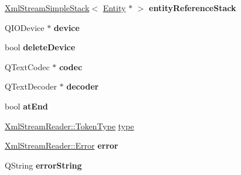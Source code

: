 \begin{DoxyCompactItemize}
\item 
\mbox{\label{class_xml_stream_reader_private_a58b68714e930a9ff4055073348e4fae2}} 
\hyperlink{class_xml_stream_simple_stack}{Xml\+Stream\+Simple\+Stack}$<$ \hyperlink{struct_xml_stream_reader_private_1_1_entity}{Entity} $\ast$ $>$ {\bfseries entity\+Reference\+Stack}
\item 
\mbox{\label{class_xml_stream_reader_private_a4b45132a2f1741d29528e6761b09b6cb}} 
Q\+I\+O\+Device $\ast$ {\bfseries device}
\item 
\mbox{\label{class_xml_stream_reader_private_a820c3b36685ad0732de72219bb76b513}} 
bool {\bfseries delete\+Device}
\item 
\mbox{\label{class_xml_stream_reader_private_a60ecf3dc7bc8675e623830057ca5982e}} 
Q\+Text\+Codec $\ast$ {\bfseries codec}
\item 
\mbox{\label{class_xml_stream_reader_private_ae366ec7dc2fc1c42d06be2f071974662}} 
Q\+Text\+Decoder $\ast$ {\bfseries decoder}
\item 
\mbox{\label{class_xml_stream_reader_private_a8fa9ec1fdd5b292553b477ae517283ba}} 
bool {\bfseries at\+End}
\item 
\hyperlink{class_xml_stream_reader_a99e2023f874f0ca648c996ae79c3b5f7}{Xml\+Stream\+Reader\+::\+Token\+Type} \hyperlink{class_xml_stream_reader_private_a3270b17a74a589cf07bd318d1bcbace7}{type}
\item 
\mbox{\label{class_xml_stream_reader_private_a8af1278f6182963a126337b89458d523}} 
\hyperlink{class_xml_stream_reader_ae7aa6749ae6e9de9bcb6f084a9884286}{Xml\+Stream\+Reader\+::\+Error} {\bfseries error}
\item 
\mbox{\label{class_xml_stream_reader_private_a1d70808ffb80728bcb0584287e9cb50d}} 
Q\+String {\bfseries error\+String}
\item 
\mbox{\label{class_xml_stream_reader_private_a36fa1355ad2b1749f6c3f67c0efb9afe}} 

\end{DoxyCompactItemize}

